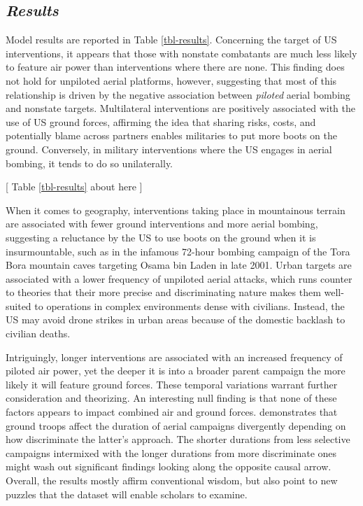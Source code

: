 \documentclass[fleqn,12pt]{article}
\begin{document}
\subsection*{\textit{Results}}
Model results are reported in Table \ref{tbl-results}. Concerning the target of US interventions, it appears that those with nonstate combatants are much less likely to feature air power than interventions where there are none. This finding does not hold for unpiloted aerial platforms, however, suggesting that most of this relationship is driven by the negative association between \textit{piloted} aerial bombing and nonstate targets. Multilateral interventions are positively associated with the use of US ground forces, affirming the idea that sharing risks, costs, and potentially blame across partners enables militaries to put more boots on the ground. Conversely, in military interventions where the US engages in aerial bombing, it tends to do so unilaterally.

\begin{center}
	[ Table \ref{tbl-results} about here ]
\end{center}

When it comes to geography, interventions taking place in mountainous terrain are associated with fewer ground interventions and more aerial bombing, suggesting a reluctance by the US to use boots on the ground when it is insurmountable, such as in the infamous 72-hour bombing campaign of the Tora Bora mountain caves targeting Osama bin Laden in late 2001. Urban targets are associated with a lower frequency of unpiloted aerial attacks, which runs counter to theories that their more precise and discriminating nature makes them well-suited to operations in complex environments dense with civilians. Instead, the US may avoid drone strikes in urban areas because of the domestic backlash to civilian deaths.

Intriguingly, longer interventions are associated with an increased frequency of piloted air power, yet the deeper it is into a broader parent campaign the more likely it will feature ground forces. These temporal variations warrant further consideration and theorizing. An interesting null finding is that none of these factors appears to impact combined air and ground forces. \citet{martinezmachain_aircampaignduration_2015} demonstrates that ground troops affect the duration of aerial campaigns divergently depending on how discriminate the latter's approach. The shorter durations from less selective campaigns intermixed with the longer durations from more discriminate ones might wash out significant findings looking along the opposite causal arrow. Overall, the results mostly affirm conventional wisdom, but also point to new puzzles that the dataset will enable scholars to examine.
\end{document}
